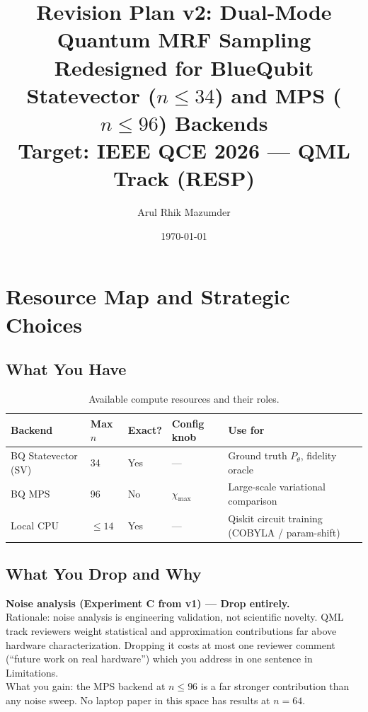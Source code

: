 \documentclass[11pt]{article}
\title{\textbf{Revision Plan v2: Dual-Mode Quantum MRF Sampling}\\[6pt]
\large Redesigned for BlueQubit Statevector ($n \leq 34$)
and MPS ($n \leq 96$) Backends\\[4pt]
\normalsize Target: IEEE QCE 2026 --- QML Track (RESP)}
\author{Arul Rhik Mazumder}
\date{\today}
\begin{document}
\maketitle

\section{Resource Map and Strategic Choices}

\subsection{What You Have}

\begin{table}[h]
\centering
\begin{tabular}{lllll}
\toprule
\textbf{Backend} & \textbf{Max $n$} & \textbf{Exact?} &
\textbf{Config knob} & \textbf{Use for} \\
\midrule
BQ Statevector (SV) & 34 & Yes & --- &
  Ground truth $P_\theta$, fidelity oracle \\
BQ MPS              & 96 & No  & $\chi_{\max}$ &
  Large-scale variational comparison \\
Local CPU           & $\leq 14$ & Yes & --- &
  Qiskit circuit training (COBYLA / param-shift) \\
\bottomrule
\end{tabular}
\caption{Available compute resources and their roles.}
\end{table}

\subsection{What You Drop and Why}

\begin{warnbox}
\textbf{Noise analysis (Experiment C from v1) --- Drop entirely.}\\
Rationale: noise analysis is engineering validation, not scientific
novelty. QML track reviewers weight statistical and approximation
contributions far above hardware characterization. Dropping it costs
at most one reviewer comment (``future work on real hardware'')
which you address in one sentence in Limitations.\\[4pt]
What you gain: the MPS backend at $n \leq 96$ is a far stronger
contribution than any noise sweep. No laptop paper in this space
has results at $n = 64$.
\end{warnbox}
\end{document}
